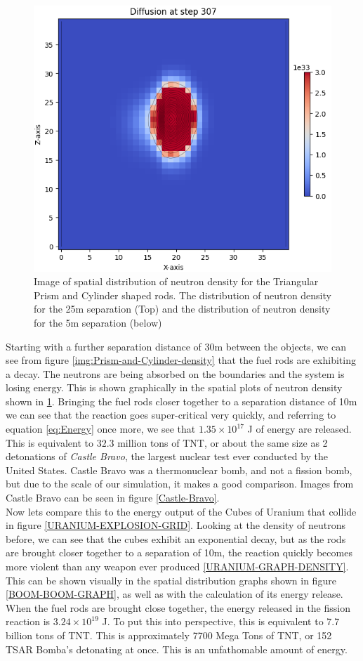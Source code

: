 \documentclass[letterpaper, 12pt]{article}
\begin{document}
\begin{figure}
            \includegraphics[width=0.22\linewidth]{Images/Cylinder-Prism-Close-4.png}
            \caption{Image of spatial distribution of neutron density for the Triangular Prism and Cylinder shaped rods. The distribution of neutron density for the 25m separation (Top) and the distribution of neutron density for the 5m separation (below)}
            \label{img:Prism-and-Cylinder-Images}
         \end{figure}

         Starting with a further separation distance of 30m between the objects, we can see from figure \ref{img:Prism-and-Cylinder-density} that the fuel rods are exhibiting a decay. The neutrons are being absorbed on the boundaries and the system is losing energy. This is shown graphically in the spatial plots of neutron density shown in \ref{img:Prism-and-Cylinder-Images}. Bringing the fuel rods closer together to a separation distance of 10m we can see that the reaction goes super-critical very quickly, and referring to equation \eqref{eq:Energy} once more, we see that $1.35 \times 10^{17}$ J of energy are released. This is equivalent to $32.3$ million tons of TNT, or about the same size as 2 detonations of \textit{Castle Bravo}, the largest nuclear test ever conducted by the United States. Castle Bravo was a thermonuclear bomb, and not a fission bomb, but due to the scale of our simulation, it makes a good comparison. Images from Castle Bravo can be seen in figure \ref{Castle-Bravo}.\\

         Now lets compare this to the energy output of the Cubes of Uranium that collide in figure \ref{URANIUM-EXPLOSION-GRID}. Looking at the density of neutrons before, we can see that the cubes exhibit an exponential decay, but as the rods are brought closer together to a separation of 10m, the reaction quickly becomes more violent than any weapon ever produced \ref{URANIUM-GRAPH-DENSITY}. This can be shown visually in the spatial distribution graphs shown in figure \ref{BOOM-BOOM-GRAPH}, as well as with the calculation of its energy release. When the fuel rods are brought close together, the energy released in the fission reaction is $3.24 \times 10^{19}$ J. To put this into perspective, this is equivalent to 7.7 billion tons of TNT. This is approximately 7700 Mega Tons of TNT, or  152 TSAR Bomba's detonating at once. This is an unfathomable amount of energy. \\
\end{document}
